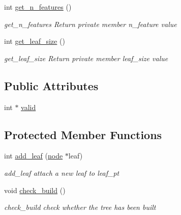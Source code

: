 \begin{DoxyCompactItemize}
int \hyperlink{classtree_a1b00b544a3da6dbca02984debccd703f}{get\+\_\+n\+\_\+features} ()
\begin{DoxyCompactList}\small\item\em get\+\_\+n\+\_\+features Return private member {\ttfamily n\+\_\+feature} value \end{DoxyCompactList}\item 
int \hyperlink{classtree_ac0ebc90fb91a1573b5b23ded01e73fcf}{get\+\_\+leaf\+\_\+size} ()
\begin{DoxyCompactList}\small\item\em get\+\_\+leaf\+\_\+size Return private member {\ttfamily leaf\+\_\+size} value \end{DoxyCompactList}\end{DoxyCompactItemize}
\subsection*{Public Attributes}
\begin{DoxyCompactItemize}
\item 
int $\ast$ \hyperlink{classtree_afa8e539406e1f8b373b147682e3a8196}{valid}
\end{DoxyCompactItemize}
\subsection*{Protected Member Functions}
\begin{DoxyCompactItemize}
\item 
int \hyperlink{classtree_a9055d00c2b5d3925c75991c5bb7b0b8a}{add\+\_\+leaf} (\hyperlink{classnode}{node} $\ast$leaf)
\begin{DoxyCompactList}\small\item\em add\+\_\+leaf attach a new leaf to {\ttfamily leaf\+\_\+pt} \end{DoxyCompactList}\item 
void \hyperlink{classtree_a1d5e50aae649ad79d312cef8177d700a}{check\+\_\+build} ()
\begin{DoxyCompactList}\small\item\em check\+\_\+build check whether the tree has been built \end{DoxyCompactList}\end{DoxyCompactItemize}
